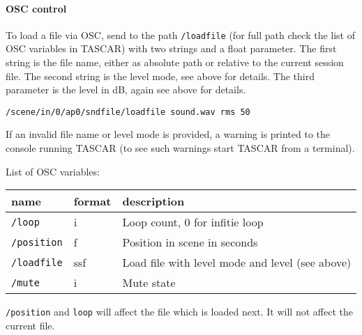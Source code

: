\paragraph{OSC control}
%
To load a file via OSC, send to the path {\tt /loadfile} (for full
path check the list of OSC variables in TASCAR) with two strings and a
float parameter.
%
The first string is the file name, either as absolute path or relative
to the current session file. The second string is the level mode, see
above for details. The third parameter is the level in dB, again see
above for details.
%
\begin{verbatim}
/scene/in/0/ap0/sndfile/loadfile sound.wav rms 50
\end{verbatim}
%
If an invalid file name or level mode is provided, a warning is
printed to the console running TASCAR (to see such warnings start
TASCAR from a terminal).

List of OSC variables:

\begin{tabularx}{\textwidth}{llX}
\hline
name            & format & description                                     \\
\hline
{\tt /loop}     & i      & Loop count, 0 for infitie loop                  \\
{\tt /position} & f      & Position in scene in seconds                    \\
{\tt /loadfile} & ssf    & Load file with level mode and level (see above) \\
{\tt /mute}     & i      & Mute state                                      \\
\hline
\end{tabularx}

\verb!/position! and \verb!loop! will affect the file which is loaded next. It will not affect the current file.
